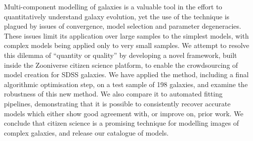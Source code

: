 \documentclass[../main.tex]{subfiles}
\begin{document}
Multi-component modelling of galaxies is a valuable tool in the effort to quantitatively understand galaxy evolution, yet the use of the technique is plagued by issues of convergence, model selection and parameter degeneracies. These issues limit its application over large samples to the simplest models, with complex models being applied only to very small samples. We attempt to resolve this dilemma of ``quantity or quality'' by developing a novel framework, built inside the Zooniverse citizen science platform, to enable the crowdsourcing of model creation for SDSS galaxies. We have applied the method, including a final algorithmic optimisation step, on a test sample of 198 galaxies, and examine the robustness of this new method. We also compare it to automated fitting pipelines, demonstrating that it is possible to consistently recover accurate models which either show good agreement with, or improve on, prior work. We conclude that citizen science is a promising technique for modelling images of complex galaxies, and release our catalogue of models.
\end{document}
